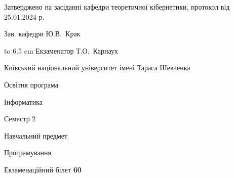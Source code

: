 \documentclass[12pt, ukrainian]{article}
\begin{document}
{\smallskip\smallskip \begin {scriptsize} Затверджено на засіданні кафедри теоретичної кібернетики, протокол   від   25.01.2024 р.\par\smallskip\smallskip\smallskip\smallskip
{\parbox {6.5 cm} {Зав. кафедри \dotfill Ю.В.~Крак}}\hspace {0.7cm} {\hbox to 6.5 cm { Екзаменатор \dotfill Т.О.~Карнаух}} \end{scriptsize}}
\newpage
{{\begin {scriptsize}\par
{ \center  Київський національний університет імені Тараса Шевченка \par}
{\parbox {5 cm}{Освітня програма \hfill}{\parbox {7 cm}{Інформатика\hfill}}\parbox {6 cm}{\hfill Семестр 2}}\par
{\parbox {5 cm} {Навчальний предмет \hfill}\parbox {7 cm}{Програмування \hfill}\parbox {6cm}{\hfill}\par}\vspace{-15pt} \end{scriptsize}}{\center Екзаменаційний білет \No \textbf { 60 }\par}}
\end{document}
